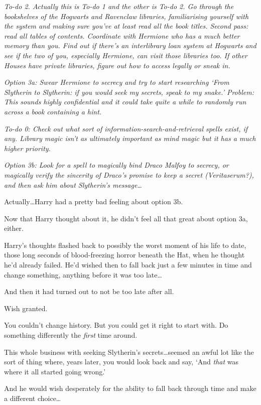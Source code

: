 \emph{To-do 2. Actually this is To-do 1 and the other is To-do 2. Go through the bookshelves of the Hogwarts and Ravenclaw libraries, familiarising yourself with the system and making sure you’ve at least read all the book titles. Second pass: read all tables of contents. Coordinate with Hermione who has a much better memory than you. Find out if there’s an interlibrary loan system at Hogwarts and see if the two of you, especially Hermione, can visit those libraries too. If other Houses have private libraries, figure out how to access legally or sneak in.}

\emph{Option 3a: Swear Hermione to secrecy and try to start researching ‘From Slytherin to Slytherin: if you would seek my secrets, speak to my snake.’ Problem: This sounds highly confidential and it could take quite a while to randomly run across a book containing a hint.}

\emph{To-do 0: Check out what sort of information-search-and-retrieval spells exist, if any. Library magic isn’t as ultimately important as mind magic but it has a much higher priority.}

\emph{Option 3b: Look for a spell to magically bind Draco Malfoy to secrecy, or magically verify the sincerity of Draco’s promise to keep a secret (Veritaserum?), and then ask \emph{him} about Slytherin’s message…}

Actually…Harry had a pretty bad feeling about option 3b.

Now that Harry thought about it, he didn’t feel all that great about option 3a, either.

Harry’s thoughts flashed back to possibly the worst moment of his life to date, those long seconds of blood-freezing horror beneath the Hat, when he thought he’d already failed. He’d wished then to fall back just a few minutes in time and change something, anything before it was too late…

And then it had turned out to not be too late after all.

Wish granted.

You couldn’t change history. But you could get it right to start with. Do something differently the \emph{first} time around.

This whole business with seeking Slytherin’s secrets…seemed an awful lot like the sort of thing where, years later, you would look back and say, ‘And \emph{that} was where it all started going wrong.’

And he would wish desperately for the ability to fall back through time and make a different choice…

